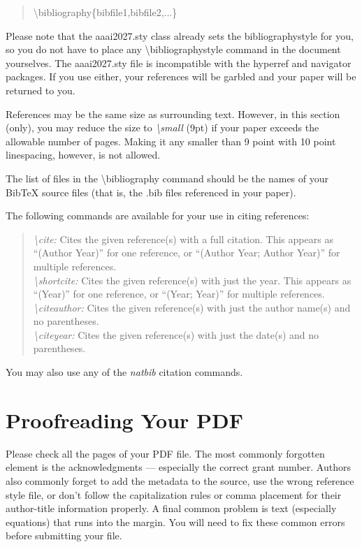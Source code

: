 \begin{quote}
\begin{small}
\textbackslash bibliography\{bibfile1,bibfile2,...\}
\end{small}
\end{quote}

Please note that the aaai2027.sty class already sets the bibliographystyle for you, so you do not have to place any \textbackslash bibliographystyle command in the document yourselves. The aaai2027.sty file is incompatible with the hyperref and navigator packages. If you use either, your references will be garbled and your paper will be returned to you.

References may be the same size as surrounding text.
However, in this section (only), you may reduce the size to {\em \textbackslash small} (9pt) if your paper exceeds the allowable number of pages. Making it any smaller than 9 point with 10 point linespacing, however, is not allowed.

The list of files in the \textbackslash bibliography command should be the names of your BibTeX source files (that is, the .bib files referenced in your paper).

The following commands are available for your use in citing references:
\begin{quote}
{\em \textbackslash cite:} Cites the given reference(s) with a full citation. This appears as ``(Author Year)'' for one reference, or ``(Author Year; Author Year)'' for multiple references.\smallskip\\
{\em \textbackslash shortcite:} Cites the given reference(s) with just the year. This appears as ``(Year)'' for one reference, or ``(Year; Year)'' for multiple references.\smallskip\\
{\em \textbackslash citeauthor:} Cites the given reference(s) with just the author name(s) and no parentheses.\smallskip\\
{\em \textbackslash citeyear:} Cites the given reference(s) with just the date(s) and no parentheses.
\end{quote}
You may also use any of the \emph{natbib} citation commands.


\section{Proofreading Your PDF}
Please check all the pages of your PDF file. The most commonly forgotten element is the acknowledgments --- especially the correct grant number. Authors also commonly forget to add the metadata to the source, use the wrong reference style file, or don't follow the capitalization rules or comma placement for their author-title information properly. A final common problem is text (especially equations) that runs into the margin. You will need to fix these common errors before submitting your file.

